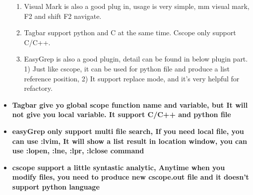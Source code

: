 \documentclass[a4paper,12pt,twoside]{book}
\begin{document}
\begin{itemize}
\begin{enumerate}
\item Visual Mark is also a good plug in, usage is very simple, mm visual mark, F2 and shift F2 navigate.

\item Tagbar support python and C at the same time. Cscope only support C/C++.

\item EasyGrep is also a good plugin, detail can be found in below plugin part. 1) Just like cscope, it can be used for python file and produce a list reference position, 2) It support replace mode, and it's very helpful for refactory.

\end{enumerate}

\item \textbf{Tagbar give yo global scope function name and variable, but It will not give you local variable. It support C/C++ and python file}

\item \textbf{easyGrep only support multi file search, If you need local file, you can use :lvim, It will show a list result in location window, you can use :lopen, :lne, :lpr, :lclose command}

\item \textbf{cscope support a little syntastic analytic, Anytime when you modify files, you need to produce new cscope.out file and it doesn't support python language}

\end{itemize}
\end{document}
